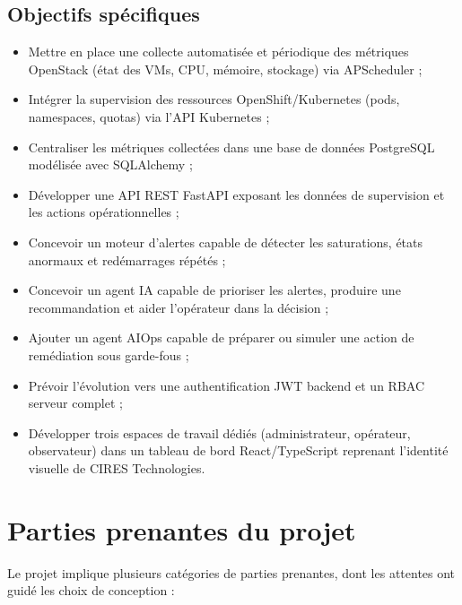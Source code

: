 \documentclass[11pt,a4paper]{report}
\begin{document}
\subsection{Objectifs spécifiques}

\begin{itemize}[label=\textbullet, leftmargin=1.5cm, labelsep=0.5cm,
                itemsep=0.1em, parsep=0em, topsep=0.2em]
    \item Mettre en place une collecte automatisée et périodique des
    métriques OpenStack (état des VMs, CPU, mémoire, stockage) via
    APScheduler ;
    \item Intégrer la supervision des ressources OpenShift/Kubernetes (pods,
    namespaces, quotas) via l'API Kubernetes ;
    \item Centraliser les métriques collectées dans une base de données
    PostgreSQL modélisée avec SQLAlchemy ;
    \item Développer une API REST FastAPI exposant les données de supervision
    et les actions opérationnelles ;
    \item Concevoir un moteur d'alertes capable de détecter les saturations,
    états anormaux et redémarrages répétés ;
    \item Concevoir un agent IA capable de prioriser les alertes, produire une
    recommandation et aider l'opérateur dans la décision ;
    \item Ajouter un agent AIOps capable de préparer ou simuler une action de
    remédiation sous garde-fous ;
    \item Prévoir l'évolution vers une authentification JWT backend et un RBAC
    serveur complet ;
    \item Développer trois espaces de travail dédiés (administrateur,
    opérateur, observateur) dans un tableau de bord React/TypeScript reprenant
    l'identité visuelle de CIRES Technologies.
\end{itemize}

\section{Parties prenantes du projet}

Le projet implique plusieurs catégories de parties prenantes, dont les
attentes ont guidé les choix de conception :
\end{document}
